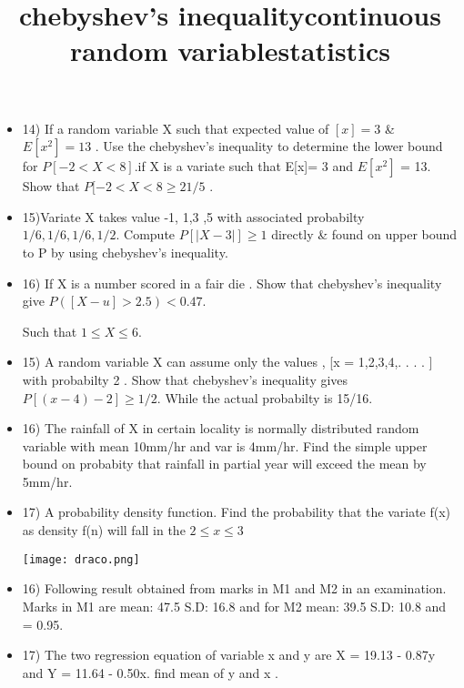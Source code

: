 \documentclass{article}
\begin{document}
\title{\Large chebyshev's inequality}

\begin{itemize}

    
    \item 14) If a random variable X such that expected value of $[x]= 3$  & $E[x^2]= 13$ . Use the chebyshev's inequality to determine the lower bound for $P[ -2 < X < 8]$.if X is a variate such that E[x]= 3 and $E[x^2]$ = 13. Show that $P[-2 < X < 8 \geq 21/5$ . 

    \item 15)Variate X takes value -1, 1,3 ,5 with associated probabilty 
    $1/6, 1/6, 1/6, 1/2$. Compute $P[|X-3|] \geq 1$ directly & found on upper bound to P by using chebyshev's inequality.

    \item 16) If X is a number scored in a fair die . Show that chebyshev's inequality give $P([X-u] > 2.5) < 0.47$.

   Such that $1 \leq X \leq 6$.

   \item 15) A random variable X can assume only the values , [x = 1,2,3,4,. . . . ] with probabilty 2 . Show that chebyshev's inequality gives $P[(x-4)-2] \geq 1/2$. While the actual probabilty is 15/16. 

   \item  16) The rainfall of X in certain locality is normally distributed random variable with mean 10mm/hr and var is 4mm/hr. Find the simple upper bound on probabity that rainfall in partial year will exceed the mean by 5mm/hr.
\end{itemize}

\title{\Large continuous random variable}
\begin{itemize}
    \item 17)  A probability density function. Find the probability that the variate f(x) as density f(n) will fall in the $2 \leq x \leq 3 $
    
    \texttt{[image: draco.png]}
\end{itemize}

\title{\large statistics}
\begin{itemize}
    \item 16) Following result obtained from marks in M1 and M2 in an examination.
    Marks in M1 are mean: 47.5 S.D: 16.8 and for M2 mean: 39.5 S.D: 10.8 and \gamma = 0.95. 

    \item 17) The two regression equation of variable x and y are 
X  = 19.13 - 0.87y and Y = 11.64 - 0.50x.
find mean of y and x .
    \end{itemize}
\end{document}
